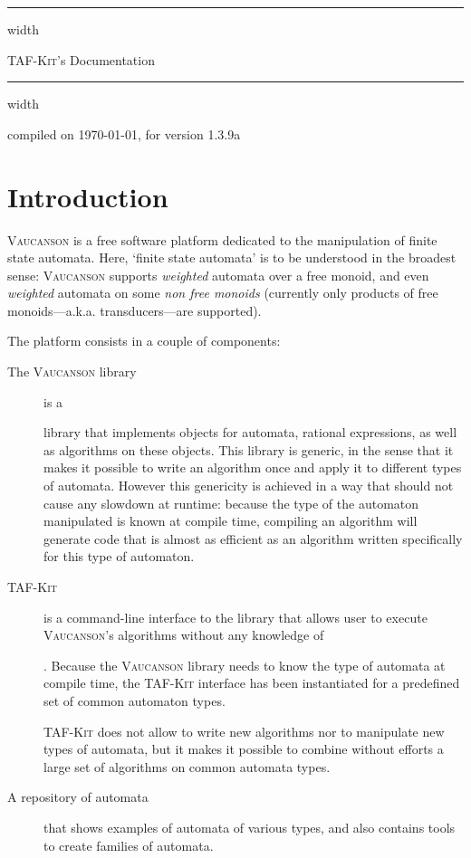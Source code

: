 \documentclass[a4paper]{report}
\makeatletter
\newcommand{\Cxx}{%
  \valign{\vfil\hbox{##}\vfil\cr
    {C\kern-.1em}\cr
    $\hbox{\fontsize\sf@size\z@\textbf{+\kern-0.05em+}}$\cr}%
    \xspace
}
\def\VcsnVersion{1.3.9a}
\newcommand{\tafkit}{\textsc{TAF-Kit}\xspace}
\newcommand{\Vauc}{\textsc{Vaucanson}\xspace}
\def\manualtitle{\tafkit's Documentation}
\makeatother
\begin{document}
\vspace*{50pt}
\vskip4pt \hrule height 4pt width \hsize \vskip4pt
\begin{center}
  \Huge \manualtitle
\end{center}
\vspace*{-1.5ex}
\vskip4pt \hrule height 4pt width \hsize \vskip4pt

\hfill compiled on \today, for version \VcsnVersion

\vfill

\setcounter{tocdepth}{2}
\makeatletter
{}
\makeatother

\vfill

\chapter*{Introduction}
\label{sec:intro}

\Vauc is a free software platform dedicated to the manipulation of
finite state automata.  Here, `finite state automata' is to be
understood in the broadest sense: \Vauc supports \emph{weighted}
automata over a free monoid, and even \emph{weighted} automata on some
\emph{non free monoids} (currently only products of free
monoids---a.k.a. transducers---are supported).

\bigskip

The platform consists in a couple of components:
\begin{description}
\item[The \Vauc library] is a \Cxx library that implements objects for
  automata, rational expressions, as well as algorithms on these
  objects.  This library is generic, in the sense that it makes it
  possible to write an algorithm once and apply it to different types
  of automata.  However this genericity is achieved in a way that
  should not cause any slowdown at runtime: because the type of the
  automaton manipulated is known at compile time, compiling an
  algorithm will generate code that is almost as efficient as an
  algorithm written specifically for this type of automaton.

\item[\tafkit] is a command-line interface to the library that allows
  user to execute \Vauc's algorithms without any knowledge of \Cxx.
  Because the \Vauc library needs to know the type of automata at
  compile time, the \tafkit interface has been instantiated for a
  predefined set of common automaton types.

  \tafkit does not allow to write new algorithms nor to manipulate new
  types of automata, but it makes it possible to combine without
  efforts a large set of algorithms on common automata types.

\item[A repository of automata] that shows examples of automata of
  various types, and also contains tools to create families of
  automata.
\end{description}
\end{document}
